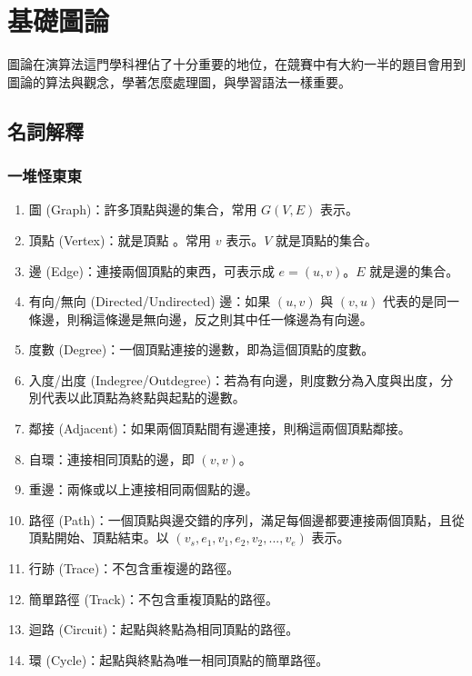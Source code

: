 \documentclass[main.tex]{subfiles}
\begin{document}
\chapter{基礎圖論}

圖論在演算法這門學科裡佔了十分重要的地位，在競賽中有大約一半的題目會用到圖論的算法與觀念，學著怎麼處理圖，與學習語法一樣重要。\\

\section{名詞解釋}
\subsection{一堆怪東東}

\begin{enumerate}
\item 圖 (Graph)：許多頂點與邊的集合，常用 $G(V, E)$ 表示。
\item 頂點 (Vertex)：就是頂點 。常用 $v$ 表示。$V$ 就是頂點的集合。
\item 邊 (Edge)：連接兩個頂點的東西，可表示成 $e = (u, v)$。$E$ 就是邊的集合。
\item 有向/無向 (Directed/Undirected) 邊：如果 $(u, v)$ 與 $(v, u)$ 代表的是同一條邊，則稱這條邊是無向邊，反之則其中任一條邊為有向邊。
\item 度數 (Degree)：一個頂點連接的邊數，即為這個頂點的度數。
\item 入度/出度 (Indegree/Outdegree)：若為有向邊，則度數分為入度與出度，分別代表以此頂點為終點與起點的邊數。
\item 鄰接 (Adjacent)：如果兩個頂點間有邊連接，則稱這兩個頂點鄰接。
\item 自環：連接相同頂點的邊，即 $(v, v)$。
\item 重邊：兩條或以上連接相同兩個點的邊。
\item 路徑 (Path)：一個頂點與邊交錯的序列，滿足每個邊都要連接兩個頂點，且從頂點開始、頂點結束。以 $(v_s, e_1, v_1, e_2, v_2, ..., v_e)$ 表示。
\item 行跡 (Trace)：不包含重複邊的路徑。
\item 簡單路徑 (Track)：不包含重複頂點的路徑。
\item 迴路 (Circuit)：起點與終點為相同頂點的路徑。
\item 環 (Cycle)：起點與終點為唯一相同頂點的簡單路徑。
\end{enumerate}
\end{document}
